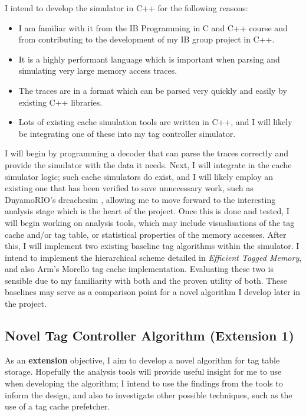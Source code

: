 \documentclass[10pt,a4paper]{article}
\begin{document}
I intend to develop the simulator in C++ for the following reasons:
\begin{itemize}
	\item I am familiar with it from the IB Programming in C and C++ course and from contributing to the development of my IB group project in C++.
	\item It is a highly performant language which is important when parsing and simulating very large memory access traces.
	\item The traces are in a format which can be parsed very quickly and easily by existing C++ libraries.
	\item Lots of existing cache simulation tools are written in C++, and I will likely be integrating one of these into my tag controller simulator.
\end{itemize}

I will begin by programming a decoder that can parse the traces correctly and provide the simulator with the data it needs. Next, I will integrate in the cache simulator logic; such cache simulators do exist, and I will likely employ an existing one that has been verified to save unnecessary work, such as DnyamoRIO's drcachesim \cite{drcachesim}, allowing me to move forward to the interesting analysis stage which is the heart of the project. Once this is done and tested, I will begin working on analysis tools, which may include visualisations of the tag cache and/or tag table, or statistical properties of the memory accesses. After this, I will implement two existing baseline tag algorithms within the simulator. I intend to implement the hierarchical scheme detailed in \textit{Efficient Tagged Memory}, and also Arm's Morello tag cache implementation. Evaluating these two is sensible due to my familiarity with both and the proven utility of both. These baselines may serve as a comparison point for a novel algorithm I develop later in the project.

\subsection*{Novel Tag Controller Algorithm (Extension 1)}
As an \textbf{extension} objective, I aim to develop a novel algorithm for tag table storage. Hopefully the analysis tools will provide useful insight for me to use when developing the algorithm; I intend to use the findings from the tools to inform the design, and also to investigate other possible techniques, such as the use of a tag cache prefetcher.
\end{document}
